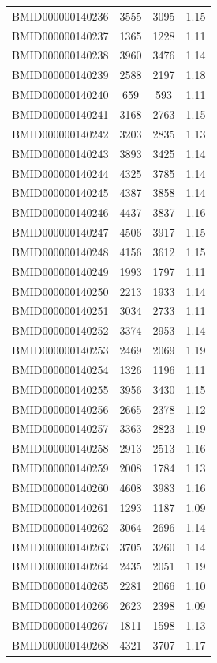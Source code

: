 \documentclass{bmcart}
\begin{document}
\begin{backmatter}
\begin{center}
\begin{longtable}{c|c|c|c}
BMID000000140236 & 3555 & 3095 & 1.15 \\
BMID000000140237 & 1365 & 1228 & 1.11 \\
BMID000000140238 & 3960 & 3476 & 1.14 \\
BMID000000140239 & 2588 & 2197 & 1.18 \\
BMID000000140240 & 659 & 593 & 1.11 \\
BMID000000140241 & 3168 & 2763 & 1.15 \\
BMID000000140242 & 3203 & 2835 & 1.13 \\
BMID000000140243 & 3893 & 3425 & 1.14 \\
BMID000000140244 & 4325 & 3785 & 1.14 \\
BMID000000140245 & 4387 & 3858 & 1.14 \\
BMID000000140246 & 4437 & 3837 & 1.16 \\
BMID000000140247 & 4506 & 3917 & 1.15 \\
BMID000000140248 & 4156 & 3612 & 1.15 \\
BMID000000140249 & 1993 & 1797 & 1.11 \\
BMID000000140250 & 2213 & 1933 & 1.14 \\
BMID000000140251 & 3034 & 2733 & 1.11 \\
BMID000000140252 & 3374 & 2953 & 1.14 \\
BMID000000140253 & 2469 & 2069 & 1.19 \\
BMID000000140254 & 1326 & 1196 & 1.11 \\
BMID000000140255 & 3956 & 3430 & 1.15 \\
BMID000000140256 & 2665 & 2378 & 1.12 \\
BMID000000140257 & 3363 & 2823 & 1.19 \\
BMID000000140258 & 2913 & 2513 & 1.16 \\
BMID000000140259 & 2008 & 1784 & 1.13 \\
BMID000000140260 & 4608 & 3983 & 1.16 \\
BMID000000140261 & 1293 & 1187 & 1.09 \\
BMID000000140262 & 3064 & 2696 & 1.14 \\
BMID000000140263 & 3705 & 3260 & 1.14 \\
BMID000000140264 & 2435 & 2051 & 1.19 \\
BMID000000140265 & 2281 & 2066 & 1.10\\
BMID000000140266 & 2623 & 2398 & 1.09 \\
BMID000000140267 & 1811 & 1598 & 1.13 \\
BMID000000140268 & 4321 & 3707 & 1.17 \\

\end{longtable}
\end{center}
\end{backmatter}
\end{document}
